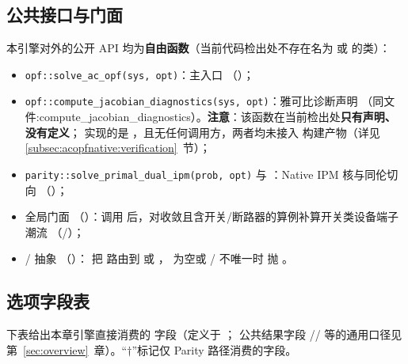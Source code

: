 \subsection{公共接口与门面}\label{subsec:acopfnative:api}

本引擎对外的公开 API 均为\textbf{自由函数}（当前代码检出处不存在名为
 或  的类）：
\begin{itemize}
  \item \texttt{opf::solve\_ac\_opf(sys, opt)}：主入口
        （）；
  \item \texttt{opf::compute\_jacobian\_diagnostics(sys, opt)}：雅可比诊断声明
        （同文件:compute\_jacobian\_diagnostics）。\textbf{注意}：该函数在当前检出处\textbf{只有声明、
        没有定义}； 实现的是
        ，且无任何调用方，两者均未接入
        构建产物（详见 \ref{subsec:acopfnative:verification}~节）；
  \item \texttt{parity::solve\_primal\_dual\_ipm(prob, opt)} 与
        ：Native IPM 核与同伦切向
        （）；
  \item {} 全局门面
        （）：调用 
        后，对收敛且含开关/断路器的算例补算开关类设备端子潮流
        （/）；
  \item {}/ 抽象
        （）：
        把  路由到  或
        ， 为空或 / 不唯一时
        抛 。
\end{itemize}

\subsection{选项字段表}\label{subsec:acopfnative:options}

下表给出本章引擎直接消费的  字段（定义于
；
公共结果字段 // 等的通用口径见
第~\ref{sec:overview}~章）。``$\dagger$''标记仅 Parity 路径消费的字段。

